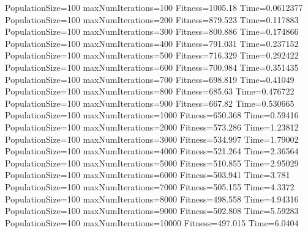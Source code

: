\documentclass[10pt,letterpaper]{article}
\begin{document}
PopulationSize=100 maxNumIterations=100 Fitness=1005.18 Time=0.0612377
PopulationSize=100 maxNumIterations=200 Fitness=879.523 Time=0.117883
PopulationSize=100 maxNumIterations=300 Fitness=800.886 Time=0.174866
PopulationSize=100 maxNumIterations=400 Fitness=791.031 Time=0.237152
PopulationSize=100 maxNumIterations=500 Fitness=716.329 Time=0.292422
PopulationSize=100 maxNumIterations=600 Fitness=700.984 Time=0.351435
PopulationSize=100 maxNumIterations=700 Fitness=698.819 Time=0.41049
PopulationSize=100 maxNumIterations=800 Fitness=685.63 Time=0.476722
PopulationSize=100 maxNumIterations=900 Fitness=667.82 Time=0.530665
PopulationSize=100 maxNumIterations=1000 Fitness=650.368 Time=0.59416
PopulationSize=100 maxNumIterations=2000 Fitness=573.286 Time=1.23812
PopulationSize=100 maxNumIterations=3000 Fitness=534.997 Time=1.79002
PopulationSize=100 maxNumIterations=4000 Fitness=521.264 Time=2.36564
PopulationSize=100 maxNumIterations=5000 Fitness=510.855 Time=2.95029
PopulationSize=100 maxNumIterations=6000 Fitness=503.941 Time=3.781
PopulationSize=100 maxNumIterations=7000 Fitness=505.155 Time=4.3372
PopulationSize=100 maxNumIterations=8000 Fitness=498.558 Time=4.94316
PopulationSize=100 maxNumIterations=9000 Fitness=502.808 Time=5.59283
PopulationSize=100 maxNumIterations=10000 Fitness=497.015 Time=6.0404
\end{document}
